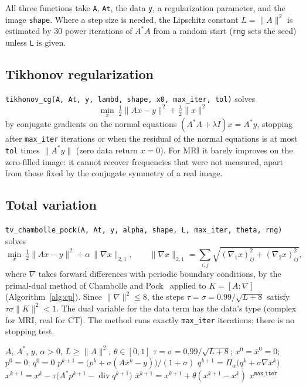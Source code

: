 \documentclass[11pt,a4paper]{article}
\newcommand{\code}[1]{\texttt{#1}}
\begin{document}
All three functions take \code{A}, \code{At}, the data \code{y}, a
regularization parameter, and the image \code{shape}. Where a step size is
needed, the Lipschitz constant $L=\|A\|^2$ is estimated by 30 power
iterations of $A^*A$ from a random start (\code{rng} sets the seed) unless
\code{L} is given.

\subsection{Tikhonov regularization}

\code{tikhonov\_cg(A, At, y, lambd, shape, x0, max\_iter, tol)} solves
\begin{equation}
  \min_x\ \tfrac12\|Ax-y\|^2 + \tfrac\lambda2\|x\|^2
\end{equation}
by conjugate gradients on the normal equations
$(A^*A+\lambda I)x = A^*y$, stopping after \code{max\_iter} iterations or
when the residual of the normal equations is at most \code{tol} times
$\|A^*y\|$ (zero data return $x=0$). For MRI it barely improves on the zero-filled image: it
cannot recover frequencies that were not measured, apart from those fixed by
the conjugate symmetry of a real image.

\subsection{Total variation}

\code{tv\_chambolle\_pock(A, At, y, alpha, shape, L, max\_iter, theta,
rng)} solves
\begin{equation}\label{eq:tv}
  \min_x\ \tfrac12\|Ax-y\|^2 + \alpha\,\|\nabla x\|_{2,1}, \qquad
  \|\nabla x\|_{2,1} = \sum_{i,j}\sqrt{(\nabla_1x)_{ij}^2+(\nabla_2x)_{ij}^2},
\end{equation}
where $\nabla$ takes forward differences with periodic boundary conditions,
by the primal-dual method of Chambolle and Pock~\cite{ChambollePock2011}
applied to $K=[A;\nabla]$ (Algorithm~\ref{alg:cp}). Since
$\|\nabla\|^2\le8$, the steps $\tau=\sigma=0.99/\sqrt{L+8}$ satisfy
$\tau\sigma\|K\|^2<1$. The dual variable for the data term has the data's
type (complex for MRI, real for CT). The method runs exactly
\code{max\_iter} iterations; there is no stopping test.

\begin{algorithm}[ht]
\caption{Chambolle--Pock for~\eqref{eq:tv} (\code{tv\_chambolle\_pock})}
\label{alg:cp}
\begin{algorithmic}[1]
\Require $A$, $A^*$, $y$, $\alpha>0$, $L\ge\|A\|^2$, $\theta\in[0,1]$
\State $\tau=\sigma=0.99/\sqrt{L+8}$; $x^0=\bar x^0=0$; $p^0=0$; $q^0=0$
\For{$k=0,1,\dots,\code{max\_iter}-1$}
  \State $p^{k+1} = \bigl(p^k + \sigma(A\bar x^k - y)\bigr)/(1+\sigma)$
  \State $q^{k+1} = \Pi_\alpha\bigl(q^k + \sigma\nabla\bar x^k\bigr)$
  \State $x^{k+1} = x^k - \tau\bigl(A^*p^{k+1} - \operatorname{div}q^{k+1}\bigr)$
  \State $\bar x^{k+1} = x^{k+1} + \theta(x^{k+1}-x^k)$
\EndFor
\State \Return $x^{\code{max\_iter}}$
\end{algorithmic}
\end{algorithm}
\end{document}
